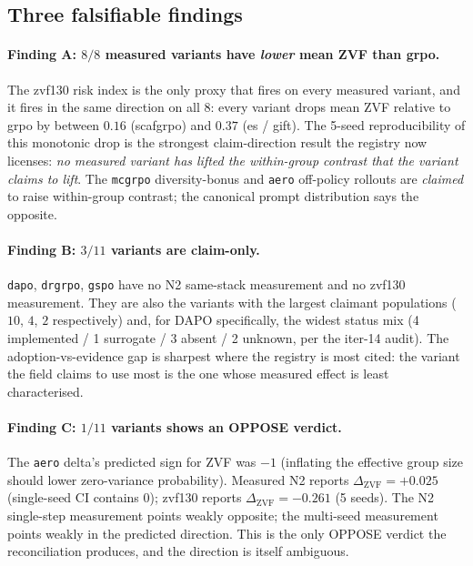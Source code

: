 \documentclass{article}
\begin{document}
\subsection{Three falsifiable findings}

\paragraph{Finding A: $8/8$ measured variants have \emph{lower} mean ZVF
than grpo.}
The zvf130 risk index is the only proxy that fires on every measured
variant, and it fires in the same direction on all 8: every variant
drops mean ZVF relative to grpo by between $0.16$ (scafgrpo) and $0.37$
(es / gift). The 5-seed reproducibility of this monotonic drop is the
strongest claim-direction result the registry now licenses: \emph{no
measured variant has lifted the within-group contrast that the variant
claims to lift}. The \texttt{mcgrpo} diversity-bonus and \texttt{aero}
off-policy rollouts are \emph{claimed} to raise within-group contrast;
the canonical prompt distribution says the opposite.

\paragraph{Finding B: $3/11$ variants are claim-only.}
\texttt{dapo}, \texttt{drgrpo}, \texttt{gspo} have no N2 same-stack
measurement and no zvf130 measurement. They are also the variants with
the largest claimant populations ($10$, $4$, $2$ respectively) and,
for DAPO specifically, the widest status mix (4 implemented / 1
surrogate / 3 absent / 2 unknown, per the iter-14 audit). The
adoption-vs-evidence gap is sharpest where the registry is most cited:
the variant the field claims to use most is the one whose measured
effect is least characterised.

\paragraph{Finding C: $1/11$ variants shows an OPPOSE verdict.}
The \texttt{aero} delta's predicted sign for ZVF was $-1$ (inflating
the effective group size should lower zero-variance probability).
Measured N2 reports $\Delta_{\text{ZVF}}{=}+0.025$ (single-seed CI
contains 0); zvf130 reports $\Delta_{\text{ZVF}}{=}-0.261$ (5 seeds).
The N2 single-step measurement points weakly opposite; the
multi-seed measurement points weakly in the predicted direction. This
is the only OPPOSE verdict the reconciliation produces, and the
direction is itself ambiguous.
\end{document}
